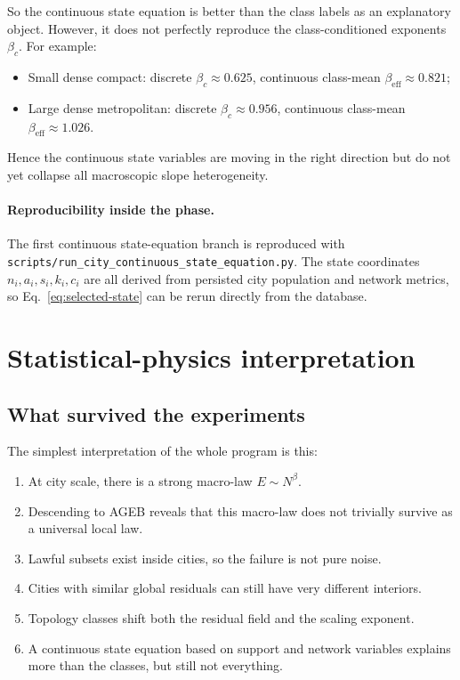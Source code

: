 \documentclass[11pt]{article}
\begin{document}
So the continuous state equation is better than the class labels as an explanatory object. However, it does not perfectly reproduce the class-conditioned exponents \(\beta_c\). For example:
\begin{itemize}
\item Small dense compact: discrete \(\beta_c \approx 0.625\), continuous class-mean \(\beta_{\mathrm{eff}} \approx 0.821\);
\item Large dense metropolitan: discrete \(\beta_c \approx 0.956\), continuous class-mean \(\beta_{\mathrm{eff}} \approx 1.026\).
\end{itemize}

Hence the continuous state variables are moving in the right direction but do not yet collapse all macroscopic slope heterogeneity.

\paragraph{Reproducibility inside the phase.}
The first continuous state-equation branch is reproduced with
\texttt{scripts/run\_city\_continuous\_state\_equation.py}.
The state coordinates \(n_i,a_i,s_i,k_i,c_i\) are all derived from persisted city population and network metrics, so Eq.~\eqref{eq:selected-state} can be rerun directly from the database.

\section{Statistical-physics interpretation}

\subsection{What survived the experiments}

The simplest interpretation of the whole program is this:
\begin{enumerate}[label=\arabic*.,leftmargin=2.0em]
\item At city scale, there is a strong macro-law \(E \sim N^\beta\).
\item Descending to AGEB reveals that this macro-law does not trivially survive as a universal local law.
\item Lawful subsets exist inside cities, so the failure is not pure noise.
\item Cities with similar global residuals can still have very different interiors.
\item Topology classes shift both the residual field and the scaling exponent.
\item A continuous state equation based on support and network variables explains more than the classes, but still not everything.
\end{enumerate}
\end{document}
